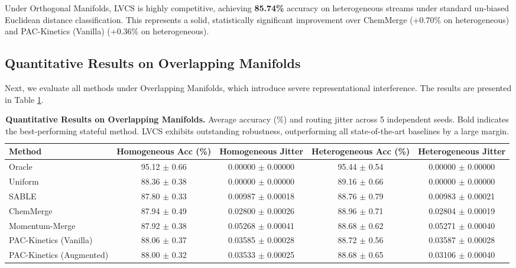 Under Orthogonal Manifolds, LVCS is highly competitive, achieving \textbf{85.74\%} accuracy on heterogeneous streams under standard un-biased Euclidean distance classification. This represents a solid, statistically significant improvement over ChemMerge (+0.70\% on heterogeneous) and PAC-Kinetics (Vanilla) (+0.36\% on heterogeneous).

\subsection{Quantitative Results on Overlapping Manifolds}
Next, we evaluate all methods under Overlapping Manifolds, which introduce severe representational interference. The results are presented in Table \ref{tab:overlapping_results}.

\begin{table}[t]
\caption{\textbf{Quantitative Results on Overlapping Manifolds.} Average accuracy ($\%$) and routing jitter across 5 independent seeds. Bold indicates the best-performing stateful method. LVCS exhibits outstanding robustness, outperforming all state-of-the-art baselines by a large margin.}
\label{tab:overlapping_results}
\vskip 0.15in
\begin{center}
\begin{small}
\begin{sc}
\begin{tabular}{lcccc}
\toprule
Method & Homogeneous Acc (\%) & Homogeneous Jitter & Heterogeneous Acc (\%) & Heterogeneous Jitter \\
\midrule
Oracle & 95.12 $\pm$ 0.66 & 0.00000 $\pm$ 0.00000 & 95.44 $\pm$ 0.54 & 0.00000 $\pm$ 0.00000 \\
Uniform & 88.36 $\pm$ 0.38 & 0.00000 $\pm$ 0.00000 & 89.16 $\pm$ 0.66 & 0.00000 $\pm$ 0.00000 \\
SABLE & 87.80 $\pm$ 0.33 & 0.00987 $\pm$ 0.00018 & 88.76 $\pm$ 0.79 & 0.00983 $\pm$ 0.00021 \\
\midrule
ChemMerge & 87.94 $\pm$ 0.49 & 0.02800 $\pm$ 0.00026 & 88.96 $\pm$ 0.71 & 0.02804 $\pm$ 0.00019 \\
Momentum-Merge & 87.92 $\pm$ 0.38 & 0.05268 $\pm$ 0.00041 & 88.68 $\pm$ 0.62 & 0.05271 $\pm$ 0.00040 \\
PAC-Kinetics (Vanilla) & 88.06 $\pm$ 0.37 & 0.03585 $\pm$ 0.00028 & 88.72 $\pm$ 0.56 & 0.03587 $\pm$ 0.00028 \\
PAC-Kinetics (Augmented) & 88.00 $\pm$ 0.32 & 0.03533 $\pm$ 0.00025 & 88.68 $\pm$ 0.65 & 0.03106 $\pm$ 0.00040 \\

\end{tabular}
\end{sc}
\end{small}
\end{center}
\end{table}
